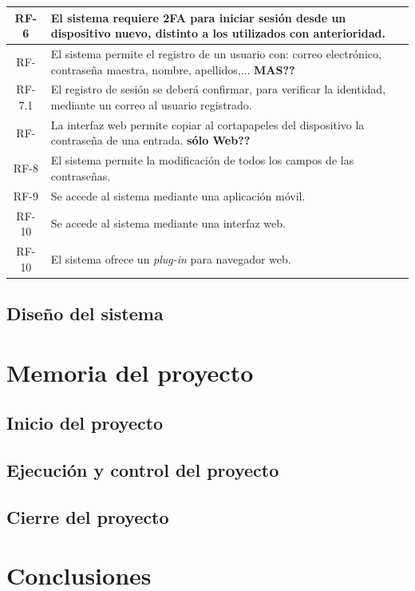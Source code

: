 \documentclass{article}
\begin{document}
\begin{table}[H]
\begin{tabular}{| c | p{30em} |}
        RF-6 & El sistema requiere 2FA para iniciar sesión desde un dispositivo nuevo, distinto a los utilizados con anterioridad. \\ \hline
        RF- & El sistema permite el registro de un usuario con: correo electrónico, contraseña maestra, nombre, apellidos,... \textbf{MAS??}\\ \hline %
        RF-7.1 & El registro de sesión se deberá confirmar, para verificar la identidad, mediante un correo al usuario registrado. \\ \hline
        RF- & La interfaz web permite copiar al cortapapeles del dispositivo la contraseña de una entrada. \textbf{sólo Web??}\\ \hline %
        RF-8 & El sistema permite la modificación de todos los campos de las contraseñas. \\ \hline
        RF-9 & Se accede al sistema mediante una aplicación móvil. \\ \hline
        RF-10 & Se accede al sistema mediante una interfaz web. \\ \hline
        RF-10 & El sistema ofrece un \textit{plug-in} para navegador web. \\ \hline
    \end{tabular}
\end{table}

\subsection{Diseño del sistema}


\section{Memoria del proyecto}

\subsection{Inicio del proyecto}

\subsection{Ejecución y control del proyecto}

\subsection{Cierre del proyecto}

\section{Conclusiones}
\end{document}
